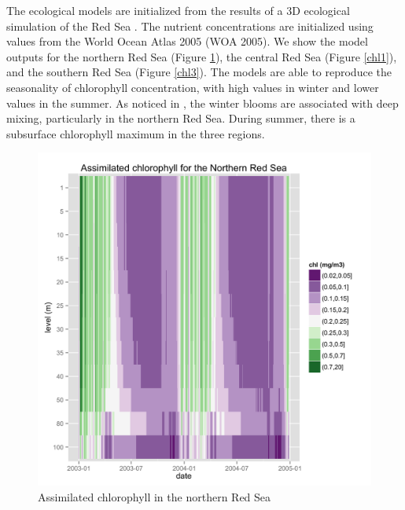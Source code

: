 The ecological models are initialized from the results of a 3D ecological
simulation of the Red Sea \citep{Triantafyllou2014}. The nutrient
concentrations are initialized using values from the World Ocean Atlas 2005
(WOA 2005). We show the model outputs for the northern Red Sea (Figure
\ref{chl2}), the central Red Sea (Figure \ref{chl1}), and the southern Red Sea
(Figure \ref{chl3}). The models are able to reproduce the seasonality of
chlorophyll concentration, with high values in winter and lower values in the
summer. As noticed in \citet{Raitsos2013}, the winter blooms are associated
with deep mixing, particularly in the northern Red Sea.  During summer, there
is a subsurface chlorophyll maximum in the three regions.

\begin{figure}
    \centering
    \includegraphics[scale=.13]{figures/chl2.png}
    \caption{Assimilated chlorophyll in the northern Red Sea}
    \label{chl2}
\end{figure}

